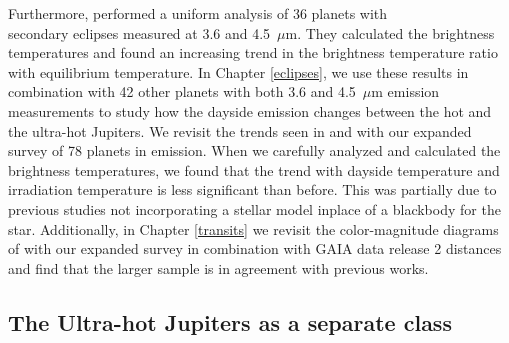 Furthermore, \citet{Garhart2020} performed a uniform analysis of 36 planets with \\
\spitzerIRAC secondary eclipses measured at 3.6 and 4.5~$\mu$m. They calculated the brightness temperatures and found an increasing trend in the brightness temperature ratio with equilibrium temperature. In Chapter \ref{eclipses}, we use these results in combination with 42 other planets with both 3.6 and 4.5~$\mu$m emission measurements to study how the dayside emission changes between the hot and the ultra-hot Jupiters. We revisit the trends seen in \citet{Schwartz2015} and \citet{Garhart2020} with our expanded survey of 78 planets in emission. When we carefully analyzed and calculated  the brightness temperatures, we found that the trend with dayside temperature and irradiation temperature is less significant than before. This was partially due to previous studies not incorporating a stellar model inplace of a blackbody for the star.
Additionally, in Chapter \ref{transits} we revisit the color-magnitude diagrams of \citet{Triaud2014b} with our expanded survey in combination with GAIA data release 2 distances and find that the larger sample is in agreement with previous works.

\subsection{The Ultra-hot Jupiters as a separate class}

